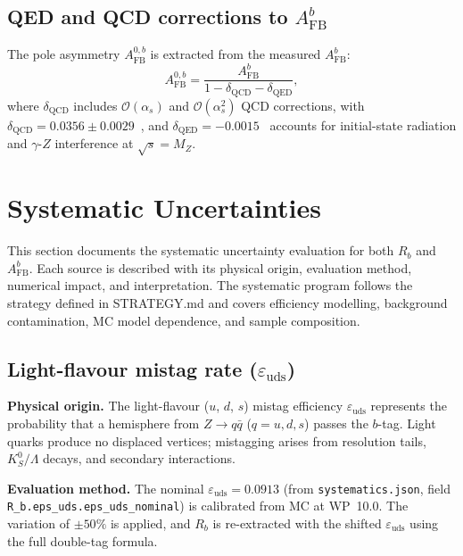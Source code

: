 \documentclass[11pt,a4paper]{article}
\begin{document}
\subsection{QED and QCD corrections to $A_\mathrm{FB}^b$}
\label{sec:qcd_corrections}

The pole asymmetry $A_\mathrm{FB}^{0,b}$ is extracted from the measured $A_\mathrm{FB}^b$:
\begin{equation}
A_\mathrm{FB}^{0,b} = \frac{A_\mathrm{FB}^b}{1 - \delta_\mathrm{QCD} - \delta_\mathrm{QED}},
\label{eq:pole_correction}
\end{equation}
where $\delta_\mathrm{QCD}$ includes $\mathcal{O}(\alpha_s)$ and $\mathcal{O}(\alpha_s^2)$
QCD corrections, with $\delta_\mathrm{QCD} = 0.0356 \pm 0.0029$~\cite{LEP:EWWG:2005},
and $\delta_\mathrm{QED} = -0.0015$~\cite{LEP:EWWG:2005} accounts for initial-state
radiation and $\gamma$-$Z$ interference at $\sqrt{s} = M_Z$.

\FloatBarrier
{}
\section{Systematic Uncertainties}
\label{sec:systematics}

This section documents the systematic uncertainty evaluation for both $R_b$ and
$A_\mathrm{FB}^b$. Each source is described with its physical origin, evaluation
method, numerical impact, and interpretation. The systematic program follows the
strategy defined in STRATEGY.md and covers efficiency modelling, background
contamination, MC model dependence, and sample composition.

\subsection{Light-flavour mistag rate ($\varepsilon_\mathrm{uds}$)}
\label{sec:syst_eps_uds}

\textbf{Physical origin.} The light-flavour ($u$, $d$, $s$) mistag efficiency
$\varepsilon_\mathrm{uds}$ represents the probability that a hemisphere from
$Z \to q\bar{q}$ ($q = u, d, s$) passes the $b$-tag. Light quarks produce no
displaced vertices; mistagging arises from resolution tails, $K_S^0/\Lambda$
decays, and secondary interactions.

\textbf{Evaluation method.} The nominal $\varepsilon_\mathrm{uds} = 0.0913$
(from \texttt{systematics.json}, field \texttt{R\_b.eps\_uds.eps\_uds\_nominal})
is calibrated from MC at WP~10.0. The variation of $\pm 50\%$ is applied, and
$R_b$ is re-extracted with the shifted $\varepsilon_\mathrm{uds}$ using the
full double-tag formula.
\end{document}
